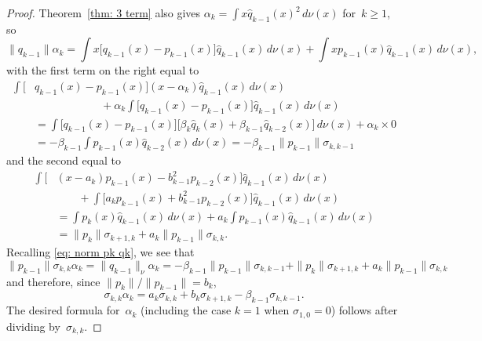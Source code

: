 \documentclass[12pt,a4paper]{article}
\begin{document}
\begin{proof}
Theorem~\ref{thm: 3 term} also gives
$\alpha_k=\int x\hat q_{k-1}(x)^2\,d\nu(x)$ for~$k\ge1$, so
\[
\|q_{k-1}\|\alpha_k=\int x\bigl[q_{k-1}(x)-p_{k-1}(x)\bigr]
	\hat q_{k-1}(x)\,d\nu(x)+\int xp_{k-1}(x)\hat q_{k-1}(x)\,d\nu(x),
\]
with the first term on the right equal to
\begin{align*}
\int\bigl[&q_{k-1}(x)-p_{k-1}(x)\bigr](x-\alpha_k)
	\hat q_{k-1}(x)\,d\nu(x)\\
	&\qquad\qquad\qquad{}
	+\alpha_k\int
		\bigl[q_{k-1}(x)-p_{k-1}(x)\bigr]\hat q_{k-1}(x)\,d\nu(x)\\
	&=\int\bigl[q_{k-1}(x)-p_{k-1}(x)\bigr]
	\bigl[\beta_k\hat q_k(x)
		+\beta_{k-1}\hat q_{k-2}(x)\bigr]
		\,d\nu(x)+\alpha_k\times0\\
	&=-\beta_{k-1}\int p_{k-1}(x)\hat q_{k-2}(x)\,d\nu(x)
	=-\beta_{k-1}\|p_{k-1}\|\sigma_{k,k-1}
\end{align*}
and the second equal to
\begin{align*}
\int\bigl[
	&(x-a_k)p_{k-1}(x)-b_{k-1}^2p_{k-2}(x)\bigr]\hat q_{k-1}(x)\,d\nu(x)\\
	&\qquad{}+\int\bigl[
		a_kp_{k-1}(x)+b_{k-1}^2p_{k-2}(x)\bigr]\hat q_{k-1}(x)\,d\nu(x)\\
	&=\int p_k(x)\hat q_{k-1}(x)\,d\nu(x)
		+a_k\int p_{k-1}(x)\hat q_{k-1}(x)\,d\nu(x)\\
	&=\|p_k\|\sigma_{k+1,k}+a_k\|p_{k-1}\|\sigma_{k,k}.
\end{align*}
Recalling \eqref{eq: norm pk qk}, we see that
\[
\|p_{k-1}\|\sigma_{k,k}\alpha_k=\|q_{k-1}\|_\nu\alpha_k
	=-\beta_{k-1}\|p_{k-1}\|\sigma_{k,k-1}
	+\|p_k\|\sigma_{k+1,k}+a_k\|p_{k-1}\|\sigma_{k,k}
\]
and therefore, since $\|p_k\|/\|p_{k-1}\|=b_k$,
\[
\sigma_{k,k}\alpha_k=a_k\sigma_{k,k}+b_k
	\sigma_{k+1,k}
	-\beta_{k-1}\sigma_{k,k-1}.
\]
The desired formula for~$\alpha_k$  (including the case $k=1$ when
$\sigma_{1,0}=0$) follows after dividing by~$\sigma_{k,k}$.
\end{proof}
\end{document}
